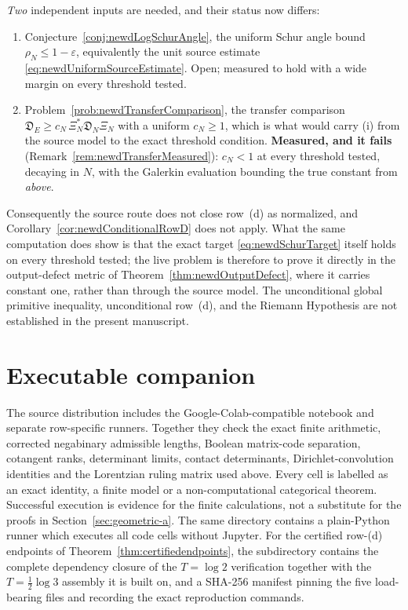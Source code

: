 \documentclass[11pt]{amsart}
\theoremstyle{definition}
\theoremstyle{remark}
\begin{document}
\begin{center}
{{\emph{Two} independent inputs are needed, and their status now differs:
\begin{enumerate}
\item[(i)] Conjecture~\ref{conj:newdLogSchurAngle}, the uniform Schur angle
bound $\rho_N\le1-\varepsilon$, equivalently the unit source estimate
\eqref{eq:newdUniformSourceEstimate}.  Open; measured to hold with a wide
margin on every threshold tested.
\item[(ii)] Problem~\ref{prob:newdTransferComparison}, the transfer
comparison $\mathfrak D_E\ge c_N\,\Xi_N^*\mathfrak D_N\Xi_N$ with a uniform
$c_N\ge1$, which is what would carry (i) from the source model to the exact
threshold condition.  \textbf{Measured, and it fails}
(Remark~\ref{rem:newdTransferMeasured}): $c_N<1$ at every threshold tested,
decaying in $N$, with the Galerkin evaluation bounding the true constant from
\emph{above}.
\end{enumerate}
Consequently the source route does not close row~(d) as normalized, and
Corollary~\ref{cor:newdConditionalRowD} does not apply.  What the same
computation does show is that the exact target
\eqref{eq:newdSchurTarget} itself holds on every threshold tested; the live
problem is therefore to prove it directly in the output-defect metric of
Theorem~\ref{thm:newdOutputDefect}, where it carries constant one, rather
than through the source model.  The unconditional global primitive
inequality, unconditional row~(d), and the Riemann Hypothesis are not
established in the present manuscript.
}}
\end{center}


\section*{Executable companion}

The source distribution includes the Google-Colab-compatible notebook
 and separate
row-specific runners.  Together they check the exact finite arithmetic,
corrected negabinary admissible lengths, Boolean matrix-code separation,
cotangent ranks, determinant limits, contact determinants,
Dirichlet-convolution identities and the Lorentzian ruling matrix used above.
Every cell is labelled as an exact identity, a finite model or a
non-computational categorical theorem.  Successful execution is evidence for
the finite calculations, not a substitute for the proofs in
Section~\ref{sec:geometric-a}.  The same directory contains a plain-Python runner
which executes all code cells without Jupyter.
For the certified row-(d) endpoints of
Theorem~\ref{thm:certifiedendpoints}, the subdirectory
 contains the complete dependency closure of the
\(T=\log2\) verification together with the \(T=\frac12\log3\) assembly it is
built on, and a SHA-256 manifest pinning the five load-bearing files and
recording the exact reproduction commands.
\end{document}
